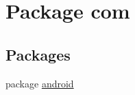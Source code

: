 \hypertarget{namespacecom}{\section{Package com}
\label{namespacecom}
}
\subsection*{Packages}
\begin{DoxyCompactItemize}
\item 
package \hyperlink{namespacecom_1_1android}{android}
\end{DoxyCompactItemize}
